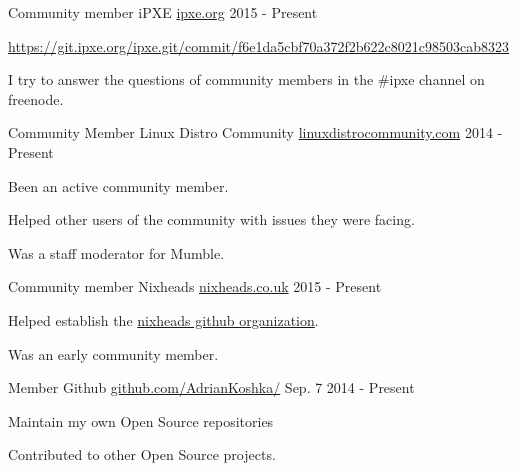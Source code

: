 \begin{cventries}

\cventry
{Community member} %
{iPXE} %
{\href{http://ipxe.org/}{ipxe.org}} %
{2015 - Present} %
{ %
\begin{cvitems}
\item {\href{Helped to debug and test a build issue on Ubuntu.}{https://git.ipxe.org/ipxe.git/commit/f6e1da5cbf70a372f2b622c8021c98503cab8323}}
\item {I try to answer the questions of community members in the \#ipxe channel on freenode.}
\end{cvitems} 
}


\cventry
{Community Member} %
{Linux Distro Community} %
{\href{https://www.linuxdistrocommunity.com/}{linuxdistrocommunity.com}} %
{2014 - Present} %
{ %
\begin{cvitems}
\item {Been an active community member.}
\item {Helped other users of the community with issues they were facing.}
\item {Was a staff moderator for Mumble.} 
\end{cvitems}
}


\cventry
{Community member} %
{Nixheads} %
{\href{http://nixheads.co.uk/}{nixheads.co.uk}} %
{2015 - Present} %
{ %
\begin{cvitems}
\item {Helped establish the \href{https://github.com/nixheads}{nixheads github organization}.}
\item {Was an early community member.}
\end{cvitems}
}


\cventry
{Member} %
{Github} %
{\href{https://github.com/AdrianKoshka/}{github.com/AdrianKoshka/}} %
{Sep. 7 2014 - Present} %
{ %
\begin{cvitems}
\item {Maintain my own Open Source repositories}
\item {Contributed to other Open Source projects.}
\end{cvitems}
}


\end{cventries}
